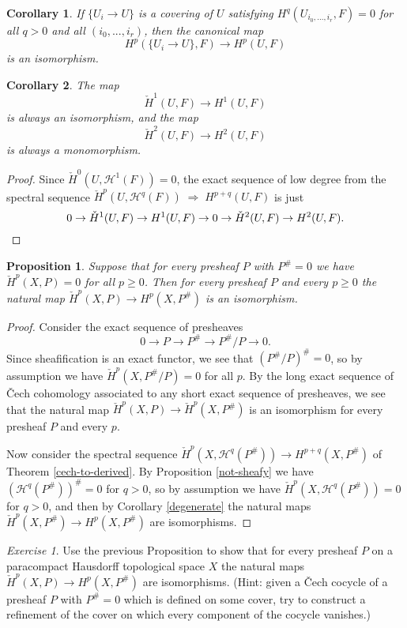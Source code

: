 \documentclass[letterpaper,11pt]{article}
\newtheorem{cor}{Corollary}
\newtheorem{prop}{Proposition}
\theoremstyle{definition}
\theoremstyle{remark}
\newtheorem{exer}{Exercise}
\begin{document}
\begin{cor}\label{good-cover} If $\{U_i\rightarrow U\}$ is a covering of $U$ satisfying $H^q(U_{i_0, ..., i_r}, F) = 0$ for all $q>0$ and all $(i_0, ..., i_r)$, then the canonical map
\[
H^p(\{U_i\rightarrow U\},F) \rightarrow H^p(U,F)
\]
is an isomorphism.
\end{cor}

\begin{cor}\label{h1} The map
\[
\check{H}^1(U,F) \rightarrow H^1(U,F)
\]
is always an isomorphism, and the map
\[
\check{H}^2(U,F) \rightarrow H^2(U,F)
\]
is always a monomorphism.
\end{cor}
\begin{proof} Since $\check{H}^0(U,\mathcal{H}^1(F)) = 0$, the exact sequence of low degree from the spectral sequence $\check{H}^p(U,\mathcal{H}^q(F)) \; \Rightarrow \; H^{p+q}(U,F)$ is just
\[
0 \rightarrow \check{H}^1(U,F) \rightarrow H^1(U,F) \rightarrow 0 \rightarrow \check{H}^2(U,F) \rightarrow H^2(U,F).\qedhere
\]
\end{proof}

\begin{prop} Suppose that for every presheaf $P$ with $P^\# = 0$ we have $\check{H}^p(X,P) = 0$ for all $p \ge 0$. Then for every presheaf $P$ and every $p\ge 0$ the natural map $\check{H}^p(X,P)\rightarrow H^p(X,P^\#)$ is an isomorphism.
\end{prop}
\begin{proof} Consider the exact sequence of presheaves
\[
0 \rightarrow P \rightarrow P^\# \rightarrow P^\#/P \rightarrow 0.
\]
Since sheafification is an exact functor, we see that $(P^\#/P)^\# = 0$, so by assumption we have $\check{H}^p(X,P^\#/P) = 0$ for all $p$. By the long exact sequence of \v{C}ech cohomology associated to any short exact sequence of presheaves, we see that the natural map $\check{H}^p(X,P) \rightarrow\check{H}^p(X,P^\#)$ is an isomorphism for every presheaf $P$ and every $p$.

Now consider the spectral sequence $\check{H}^p(X,\mathcal{H}^q(P^\#))\rightarrow H^{p+q}(X,P^\#)$ of Theorem \ref{cech-to-derived}. By Proposition \ref{not-sheafy} we have $(\mathcal{H}^q(P^\#))^\# = 0$ for $q > 0$, so by assumption we have $\check{H}^p(X,\mathcal{H}^q(P^\#)) = 0$ for $q > 0$, and then by Corollary \ref{degenerate} the natural maps $\check{H}^p(X,P^\#) \rightarrow H^p(X,P^\#)$ are isomorphisms.
\end{proof}

\begin{exer} Use the previous Proposition to show that for every presheaf $P$ on a paracompact Hausdorff topological space $X$ the natural maps $\check{H}^p(X,P)\rightarrow H^p(X,P^\#)$ are isomorphisms. (Hint: given a \v{C}ech cocycle of a presheaf $P$ with $P^\# = 0$ which is defined on some cover, try to construct a refinement of the cover on which every component of the cocycle vanishes.)
\end{exer}
\end{document}
